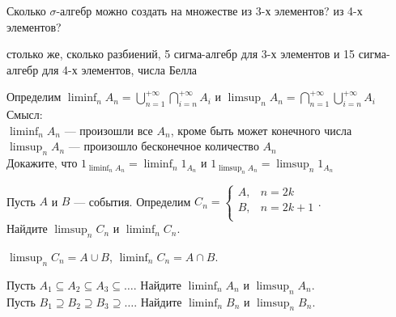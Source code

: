 \begin{problem}
Сколько $\sigma$-алгебр можно создать на множестве из 3-х элементов? из 4-х элементов?

\begin{sol}
столько же, сколько разбиений, 5 сигма-алгебр для 3-х элементов и 15 сигма-алгебр для 4-х элементов, числа Белла
\end{sol}
\end{problem}

\begin{problem}
Определим $\liminf_{n}
A_{n}=\bigcup_{n=1}^{+\infty}\bigcap_{i=n}^{+\infty}A_{i}$ и
$\limsup_{n}
A_{n}=\bigcap_{n=1}^{+\infty}\bigcup_{i=n}^{+\infty}A_{i}$ \\
Смысл: \\
$\liminf_{n} A_{n}$ — произошли все $A_{n}$, кроме быть может
конечного числа \\
$\limsup_{n} A_{n}$ — произошло бесконечное количество $A_{n}$ \\
Докажите, что $1_{\liminf_{n}A_{n}}=\liminf_{n}1_{A_{n}}$ и
$1_{\limsup_{n}A_{n}}=\limsup_{n}1_{A_{n}}$

\begin{sol}

\end{sol}
\end{problem}

\begin{problem}
Пусть $A$ и $B$ — события. Определим $C_{n}=
\begin{cases}
  A, & n=2k \\
  B, & n=2k+1 \\
\end{cases}$. \\
Найдите $\limsup_{n}C_{n}$ и $\liminf_{n}C_{n}$.

\begin{sol}
$\limsup_{n}C_{n}=A\cup B$, $\liminf_{n}C_{n}=A\cap B$.
\end{sol}
\end{problem}

\begin{problem}
Пусть $A_{1} \subseteq A_{2} \subseteq A_{3} \subseteq \ldots$.
Найдите $\liminf_{n}A_{n}$ и $\limsup_{n}A_{n}$. \\
Пусть $B_{1} \supseteq B_{2} \supseteq B_{3} \supseteq \ldots$.
Найдите $\liminf_{n}B_{n}$ и $\limsup_{n}B_{n}$.


\begin{sol}

\end{sol}
\end{problem}

